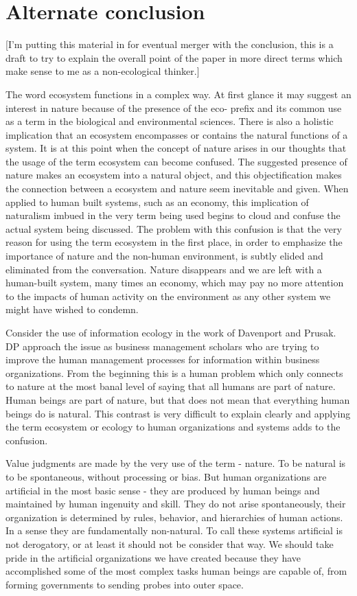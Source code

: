 \section{Alternate conclusion}

[I'm putting this material in for eventual merger with the conclusion, this is a draft to try to explain the overall point of the paper in more direct terms which make sense to me as a non-ecological thinker.]

The word ecosystem functions in a complex way. At first glance it may suggest an interest in nature because of the presence of the eco- prefix and its common use as a term in the biological and environmental sciences. There is also a holistic implication that an ecosystem encompasses or contains the natural functions of a system. It is at this point when the concept of nature arises in our thoughts that the usage of the term ecosystem can become confused. The suggested presence of nature makes an ecosystem into a natural object, and this objectification makes the connection between a ecosystem and nature seem inevitable and given. When applied to human built systems, such as an economy, this implication of naturalism imbued in the very term being used begins to cloud and confuse the actual system being discussed. The problem with this confusion is that the very reason for using the term ecosystem in the first place, in order to emphasize the importance of nature and the non-human environment, is subtly elided and eliminated from the conversation. Nature disappears and we are left with  a human-built system, many times an economy, which may pay no more attention to the impacts of human activity on the environment as any other system we might have wished to condemn.

Consider the use of information ecology in the work of Davenport and Prusak. DP approach the issue as business management scholars who are trying to improve the human management processes for information within business organizations. From the beginning this is a human problem which only connects to nature at the most banal level of saying that all humans are part of nature. Human beings are part of nature, but that does not mean that everything human beings do is natural. This contrast is very difficult to explain clearly and applying the term ecosystem or ecology to human organizations and systems adds to the confusion.

Value judgments are made by the very use of the term - nature. To be natural is to be spontaneous, without processing or bias. But human organizations are artificial in the most basic sense - they are produced by human beings and maintained by human ingenuity and skill. They do not arise spontaneously, their organization is determined by rules, behavior, and hierarchies of human actions. In a sense they are fundamentally non-natural. To call these systems artificial is not derogatory, or at least it should not be consider that way. We should take pride in the artificial organizations we have created because they have accomplished some of the most complex tasks human beings are capable of, from forming governments to sending probes into outer space.

